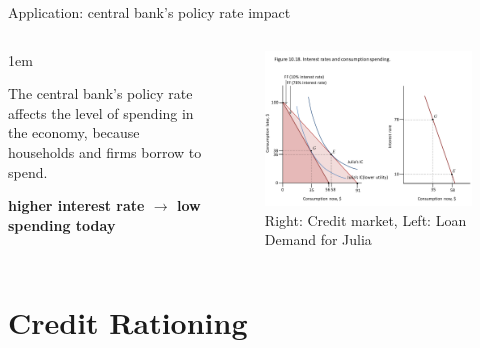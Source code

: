 \documentclass[11pt,aspectratio=43,usenames,dvipsnames]{beamer}
\let\olditemize=\itemize
\let\endolditemize=\enditemize
\renewenvironment{itemize}{\olditemize \itemsep1em}{\endolditemize}
\theoremstyle{definition}
\begin{document}
\begin{frame}{Application: central bank's policy rate impact}
\label{slide:Application__central_bank_s_policy_rate_impact}
    \begin{columns}
        \begin{column}{0.3\textwidth}
            \begin{itemize}
                \item The central bank's policy rate affects the level of spending in the economy, because households and firms borrow to spend.
                \item \textbf{higher interest rate $ \rightarrow  $ low spending today}
            \end{itemize}
        \end{column}
        \begin{column}{0.7\textwidth}
            \begin{figure}
                \centering
                \includegraphics[trim = {0cm 0.5cm 0.5cm 1.5cm}, clip, width=\textwidth]{./figures/Figure25.pdf}
                \caption{Right: Credit market, Left: Loan Demand for Julia}
            \end{figure}

        \end{column}
    \end{columns}

\end{frame}

\section[ \faCreditCard \faLock ]{Credit Rationing}
\label{sec:Credit_Rationing}
\end{document}
